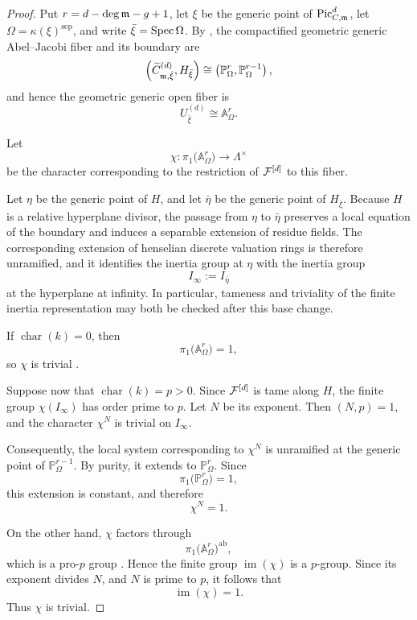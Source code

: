\begin{proof}
Put $r=d-\deg\mdls-g+1$, let $\xi$ be the generic point of $\PicCm[d]$,
let $\Omega=\kappa(\xi)^{\mathrm{sep}}$, and write
$\bar\xi=\Spec\Omega$. By
, the compactified geometric
generic Abel--Jacobi fiber and its boundary are
\[
    \left(
    \widetilde C^{(d)}_{\mdls,\bar\xi},
    H_{\bar\xi}
    \right)
    \cong
    \left(
    \mathbb P^r_{\Omega},
    \mathbb P^{r-1}_{\Omega}
    \right),
\]
and hence the geometric generic open fiber is
\[
    U^{(d)}_{\bar\xi}\cong\mathbb A^r_{\Omega}.
\]

Let
\[
    \chi\colon
    \pi_1\bigl(\mathbb A^r_{\Omega}\bigr)
       \longrightarrow \Lambda^\times
\]
be the character corresponding to the restriction of $\cF^{[d]}$ to this
fiber.

Let $\eta$ be the generic point of $H$, and let $\bar\eta$ be the generic
point of $H_{\bar\xi}$. Because $H$ is a relative hyperplane divisor, the
passage from $\eta$ to $\bar\eta$ preserves a local equation of the
boundary and induces a separable extension of residue fields. The
corresponding extension of henselian discrete valuation rings is therefore
unramified, and it identifies the inertia group at $\eta$ with the inertia
group
\[
    I_\infty:=I_{\bar\eta}
\]
at the hyperplane at infinity. In particular, tameness and triviality of
the finite inertia representation may both be checked after this base
change.

If $\operatorname{char}(k)=0$, then
\[
    \pi_1\bigl(\mathbb A^r_{\Omega}\bigr)=1,
\]
so $\chi$ is trivial
\cite[Example~4.14]{tendler2015geometricclassfieldtheory}.

Suppose now that $\operatorname{char}(k)=p>0$. Since $\cF^{[d]}$ is tame
along $H$,
the finite group $\chi(I_\infty)$ has order prime to $p$. Let $N$ be its
exponent. Then $(N,p)=1$, and the character $\chi^N$ is trivial on
$I_\infty$.

Consequently, the local system corresponding to $\chi^N$ is unramified at
the generic point of $\mathbb P^{r-1}_{\Omega}$. By purity, it extends to
$\mathbb P^r_{\Omega}$. Since
\[
    \pi_1\bigl(\mathbb P^r_{\Omega}\bigr)=1,
\]
this extension is constant, and therefore
\[
    \chi^N=1.
\]

On the other hand, $\chi$ factors through
\[
    \pi_1\bigl(\mathbb A^r_{\Omega}\bigr)^{\mathrm{ab}},
\]
which is a pro-$p$ group
\cite[Example~4.15]{tendler2015geometricclassfieldtheory}. Hence the finite
group $\operatorname{im}(\chi)$ is a $p$-group. Since its exponent divides
$N$, and $N$ is prime to $p$, it follows that
\[
    \operatorname{im}(\chi)=1.
\]
Thus $\chi$ is trivial.


\end{proof}
